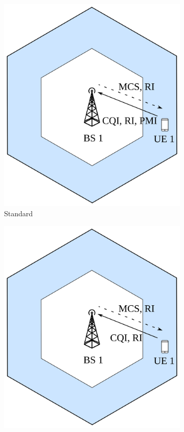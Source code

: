 \begin{figure}
     \centering
     \begin{subfigure}[htb]{0.3\textwidth}
         \centering
         \includegraphics[width=\textwidth]{figures/chp_la/system_model_1.png}
         \caption{Standard}
         \label{fig:la-system-model-1}
     \end{subfigure}
     \hfill
     \begin{subfigure}[htb]{0.3\textwidth}
         \centering
         \includegraphics[width=\textwidth]{figures/chp_la/system_model_2.png}

\end{subfigure}
\end{figure}
